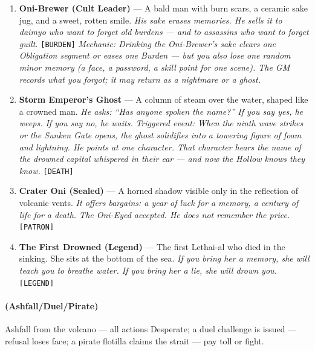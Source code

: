 \begin{enumerate}
  \hfill \textit{His retainers wear masks of their own faces --- cast from the moment they swore loyalty.} \texttt{[CORRUPTION]}
\item[J] \textbf{Oni-Brewer (Cult Leader)} --- A bald man with burn scars, a ceramic sake jug, and a sweet, rotten smile.
  \hfill \textit{His sake erases memories. He sells it to daimyo who want to forget old burdens --- and to assassins who want to forget guilt.} \texttt{[BURDEN]}
  \textit{Mechanic: Drinking the Oni-Brewer's sake clears one Obligation segment or eases one Burden --- but you also lose one random minor memory (a face, a password, a skill point for one scene). The GM records what you forgot; it may return as a nightmare or a ghost.}
\item[Q] \textbf{Storm Emperor's Ghost} --- A column of steam over the water, shaped like a crowned man.
  \hfill \textit{He asks: ``Has anyone spoken the name?'' If you say yes, he weeps. If you say no, he waits.}
  \textit{Triggered event: When the ninth wave strikes or the Sunken Gate opens, the ghost solidifies into a towering figure of foam and lightning. He points at one character. That character hears the name of the drowned capital whispered in their ear --- and now the Hollow knows they know.} \texttt{[DEATH]}
\item[K] \textbf{Crater Oni (Sealed)} --- A horned shadow visible only in the reflection of volcanic vents.
  \hfill \textit{It offers bargains: a year of luck for a memory, a century of life for a death. The Oni-Eyed accepted. He does not remember the price.} \texttt{[PATRON]}
\item[A] \textbf{The First Drowned (Legend)} --- The first Lethai-al who died in the sinking. She sits at the bottom of the sea.
  \hfill \textit{If you bring her a memory, she will teach you to breathe water. If you bring her a lie, she will drown you.} \texttt{[LEGEND]}
\end{enumerate}

\paragraph*{(Ashfall/Duel/Pirate)} Ashfall from the volcano --- all actions Desperate; a duel challenge is issued --- refusal loses face; a pirate flotilla claims the strait --- pay toll or fight.

